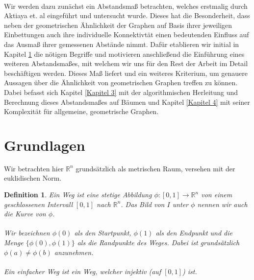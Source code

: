 \documentclass[a4paper, 12pt, twoside]{article}
\theoremstyle{Format1} %
\newtheorem{Def}{Definition}[section]       %
\begin{document}
\\
Wir werden dazu zunächst ein Abstandsmaß betrachten, welches erstmalig durch Aktiaya et. al \cite{Akitaya} eingeführt und untersucht wurde. Dieses hat die Besonderheit, dass neben der geometrischen Ähnlichkeit
der Graphen auf Basis ihrer jeweiligen Einbettungen auch ihre individuelle Konnektivtät einen bedeutenden Einfluss auf das Ausmaß ihrer gemessenen Abstände nimmt.
Dafür etablieren wir initial in Kapitel \ref{Kapitel 2} die nötigen Begriffe und
motivieren anschließend die Einführung eines weiteren Abstandsmaßes, mit welchem wir uns für den Rest der Arbeit im Detail beschäftigen werden. Dieses Maß liefert und ein weiteres Kriterium, um genauere Aussagen
über die Ähnlichkeit von geometrischen Graphen treffen zu können.
Dabei befasst sich Kapitel \ref{Kapitel 3} mit der algorithmischen Herleitung und Berechnung dieses Abstandsmaßes auf Bäumen und Kapitel \ref{Kapitel 4} mit seiner Komplexität für allgemeine, geometrische Graphen.
\newpage

\section{Grundlagen} \label{Kapitel 2}
Wir betrachten hier $ \mathbb{R}^n $ grundsätzlich als metrischen Raum, versehen mit der euklidischen Norm.

\begin{Def}
	Ein \textit{Weg} ist eine stetige Abbildung $ \phi: [0,1] \to \mathbb{R}^n $ von einem geschlossenen Intervall $[0,1]$ nach $\mathbb{R}^n$.
	Das Bild von $I$ unter $\phi$ nennen wir auch die \textit{Kurve} von $\phi$.
	\\
	\\
	Wir bezeichnen $\phi(0)$ als den \textit{Startpunkt}, $\phi(1)$ als den \textit{Endpunkt} und die Menge
	$\{\phi(0), \phi(1)\}$ als die \textit{Randpunkte} des Weges. Dabei ist grundsätzlich $\phi(a) \neq \phi(b)$ anzunehmen.
	\\
	\\
	Ein \textit{einfacher Weg} ist ein Weg, welcher injektiv (auf $[0,1]$) ist.
\end{Def}
\end{document}
